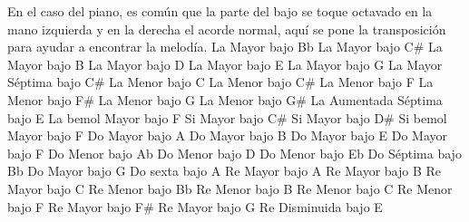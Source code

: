 En el caso del piano, es com\'un que la parte del bajo se toque octavado en la mano izquierda y en la derecha el acorde normal, aqu\'i se pone la transposici\'on para ayudar a encontrar la melod\'ia.
\vskip 25pt
\small
\upchord{\AAsPiano}La Mayor bajo Bb \hfill
\upchord{\ACsPiano}La Mayor bajo C\# \hfill\null\break
\vskip 20pt
\upchord{\ABPiano}La Mayor bajo B \hfill
\upchord{\ADPiano}La Mayor bajo D \hfill\null\break
\vskip 20pt
\upchord{\AEPiano}La Mayor bajo E \hfill
\upchord{\AGPiano}La Mayor bajo G \hfill\null\break
\vskip 20pt
\upchord{\AsevenCsPiano}La Mayor S\'eptima bajo C\# \hfill
\upchord{\AmCPiano}La Menor bajo C \hfill\null\break
\vskip 20pt
\upchord{\AmCsPiano}La Menor bajo C\# \hfill
\upchord{\AmFPiano}La Menor bajo F \hfill\null\break
\vskip 20pt
\upchord{\AmFsPiano}La Menor bajo F\# \hfill
\upchord{\AmGPiano}La Menor bajo G \hfill
\upchord{\AmGsPiano}La Menor bajo G\# \hfill\null\break
\vskip 20pt
 \hfill
\upchord{\AaugsevenEPiano}La Aumentada S\'eptima bajo E \hfill
\upchord{\AflatFPiano}La bemol Mayor bajo F \hfill\null\break
\vskip 20pt
\upchord{\BCsPiano}Si Mayor bajo C\# \hfill
\upchord{\BDsPiano}Si Mayor bajo D\# \hfill
\upchord{\BflatFPiano}Si bemol Mayor bajo F \hfill\null\break
\vskip 20pt
 \hfill
{} \hfill\null\break
\vskip 20pt
 \hfill
\upchord{\CAPiano}Do Mayor bajo A \hfill\null\break
\vskip 20pt
\upchord{\CBPiano}Do Mayor bajo B \hfill
\upchord{\CEPiano}Do Mayor bajo E \hfill\null\break
\vskip 20pt
\upchord{\CFPiano}Do Mayor bajo F \hfill
\upchord{\CmAflatPiano}Do Menor bajo Ab \hfill\null\break
\vskip 20pt
\upchord{\CmDPiano}Do Menor bajo D \hfill
\upchord{\CmEflatPiano}Do Menor bajo Eb \hfill\null\break
\vskip 20pt
\upchord{\CsevenBflatPiano}\quad Do S\'eptima bajo Bb \hfill
\upchord{\CGPiano}Do Mayor bajo G \hfill\null\break
\vskip 20pt
\upchord{\CsixAPiano}Do sexta bajo A \hfill
\upchord{\DAPiano}Re Mayor bajo A \hfill\null\break
\vskip 20pt
\upchord{\DBPiano}Re Mayor bajo B \hfill
\upchord{\DCPiano}Re Mayor bajo C \hfill\null\break
\vskip 20pt
\upchord{\DmBflatPiano}Re Menor bajo Bb \hfill
\upchord{\DmBPiano}Re Menor bajo B \hfill\null\break
\vskip 20pt
\upchord{\DmCPiano}Re Menor bajo C \hfill
\upchord{\DmFPiano}Re Menor bajo F \hfill
{} \hfill\null\break
\vskip 20pt
\upchord{\DFsPiano}Re Mayor bajo F\# \hfill
\upchord{\DGPiano}Re Mayor bajo G \hfill
\upchord{\DdimEPiano}Re Disminuida bajo E \hfill\null\break
